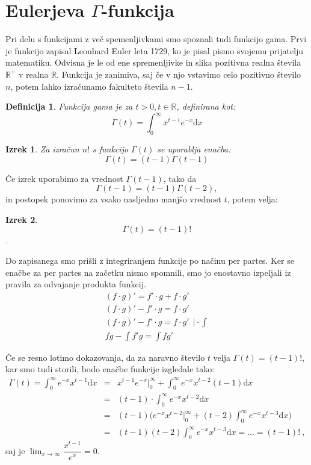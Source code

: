 \documentclass[12pt, a4paper]{article}
\newtheorem{izrek}{Izrek}
\newtheorem{definicija}{Definicija}
\begin{document}

\section{Eulerjeva $\Gamma $-funkcija}

Pri delu s funkcijami z več spemenljivkami smo spoznali tudi funkcijo gama. Prvi je funkcijo zapisal Leonhard Euler leta 1729, ko je pisal pismo svojemu prijatelju matematiku. Odvisna je le od ene spremenljivke in slika pozitivna realna števila $\mathbb{R}^+$ v realna $\mathbb{R} $. Funkcija je zanimiva, saj če v njo vstavimo celo pozitivno število $n$, potem lahko izračunamo fakulteto števila $n-1$.
\begin{definicija}
Funkcija gama je za $t>0, t\in\mathbb{R}$, definirana kot:
\[ \Gamma (t) = \int^{\infty}_{0} x^{t-1} e^{-x} \mathrm{d} x \]
\end{definicija}

\begin{izrek} 
\label{izrek:enacbazagamo}
Za izračun $n!$ s funkcijo $ \Gamma (t)$ se uporablja enačba:
\[ \Gamma (t) = (t - 1) \Gamma (t-1) \] 
\end{izrek}


Če izrek uporabimo za vrednost $ \Gamma (t-1) $, tako da  $$ \Gamma (t-1) = (t-1) \Gamma (t-2),$$ in postopek ponovimo za vsako nasljedno manjšo vrednost $t$,
potem velja: 
\begin{izrek}
\[ \Gamma (t) = (t-1)! \].
\end{izrek}

Do zapisanega smo prišli z integriranjem funkcije po načinu per partes. Ker se enačbe za per partes na začetku nismo spomnili, smo jo enostavno izpeljali iz pravila za odvajanje produkta funkcij.
\begin{eqnarray*}
 (f \cdot g)' = f' \cdot g + f \cdot g' \\
(f \cdot g)' - f' \cdot g =  f \cdot g' \\
(f \cdot g)' - f' \cdot g =  f \cdot g' ~~ \Big| \cdot \int \\
fg - \int f'g = \int fg' 
\end{eqnarray*}

Če se resno lotimo dokazovanja, da za naravno število $t$ velja $ \Gamma (t) = (t-1)!$, kar smo tudi storili, bodo enačbe funkcije izgledale tako:
\begin{eqnarray*} 
\Gamma (t) = \int^{\infty}_{0} e^{-x} x^{t-1} \mathrm{d} x &=& x^{t-1} e^{-x} \Big|^{\infty}_{0} + \int^{\infty}_{0} e^{-x} x^{t-2} (t-1) \mathrm{d} x \\
&=&  (t-1) \cdot \int^{\infty}_{0} e^{-x} x^{t-2} \mathrm{d} x \\
&=& (t-1) \Big( e^{-x} x^{t-2} \Big|^{\infty}_{0} + (t-2) \int^{\infty}_{0} e^{-x} x^{t-3} \mathrm{d} x \Big) \\
&=& (t-1)(t-2) \int^{\infty}_{0} e^{-x} x^{t-3} \mathrm{d} x = \ldots = (t-1)! ~ , 
\end{eqnarray*}
saj je $ \lim_{x \to \infty} \dfrac{x^{t-1}}{e^x} = 0 $. 
\end{document}
